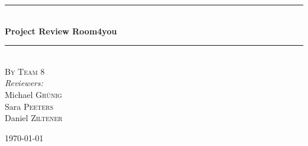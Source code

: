 \begin{titlepage}
\begin{center}



\newcommand{\HRule}{\rule{\linewidth}{0.5mm}}
\HRule \\[0.4cm]
{ \huge \bfseries Project Review Room4you}\\[0.4cm]
\HRule \\[1.5cm]
\textsc{\Large By Team 8}\\[1.5cm]

\emph{Reviewers:}\\
Michael \textsc{Gr\"unig}\\
Sara \textsc{Peeters}\\
Daniel \textsc{Ziltener}


\vfill

{\large \today}

\end{center}

\end{titlepage}